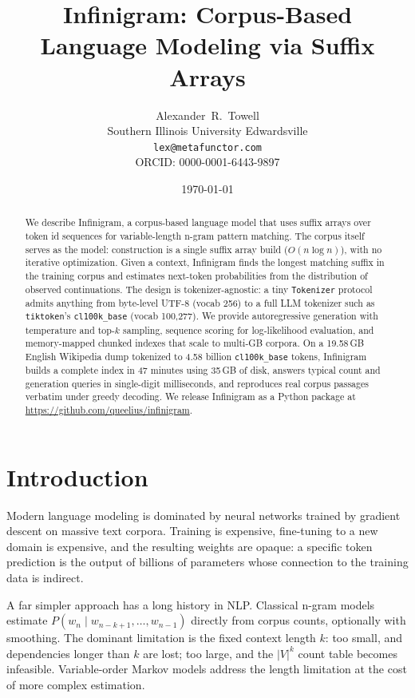 \documentclass[11pt]{article}
\title{Infinigram: Corpus-Based Language Modeling via Suffix Arrays}
\author{
  Alexander~R.~Towell\\
  Southern Illinois University Edwardsville\\
  \texttt{lex@metafunctor.com}\\
  ORCID: 0000-0001-6443-9897
}
\date{\today}
\begin{document}
\maketitle

\begin{abstract}
We describe Infinigram, a corpus-based language model that uses suffix arrays over token id sequences for variable-length n-gram pattern matching. The corpus itself serves as the model: construction is a single suffix array build ($O(n \log n)$), with no iterative optimization. Given a context, Infinigram finds the longest matching suffix in the training corpus and estimates next-token probabilities from the distribution of observed continuations. The design is tokenizer-agnostic: a tiny \texttt{Tokenizer} protocol admits anything from byte-level UTF-8 (vocab 256) to a full LLM tokenizer such as \texttt{tiktoken}'s \texttt{cl100k\_base} (vocab 100{,}277). We provide autoregressive generation with temperature and top-$k$ sampling, sequence scoring for log-likelihood evaluation, and memory-mapped chunked indexes that scale to multi-GB corpora. On a 19.58\,GB English Wikipedia dump tokenized to 4.58 billion \texttt{cl100k\_base} tokens, Infinigram builds a complete index in 47 minutes using 35\,GB of disk, answers typical count and generation queries in single-digit milliseconds, and reproduces real corpus passages verbatim under greedy decoding. We release Infinigram as a Python package at \url{https://github.com/queelius/infinigram}.
\end{abstract}

\section{Introduction}

Modern language modeling is dominated by neural networks trained by gradient descent on massive text corpora. Training is expensive, fine-tuning to a new domain is expensive, and the resulting weights are opaque: a specific token prediction is the output of billions of parameters whose connection to the training data is indirect.

A far simpler approach has a long history in NLP. Classical n-gram models \citep{jelinek1991,chen1996empirical} estimate $P(w_n \mid w_{n-k+1}, \ldots, w_{n-1})$ directly from corpus counts, optionally with smoothing. The dominant limitation is the fixed context length $k$: too small, and dependencies longer than $k$ are lost; too large, and the $|V|^k$ count table becomes infeasible. Variable-order Markov models \citep{rissanen1983,begleiter2004prediction} address the length limitation at the cost of more complex estimation.
\end{document}
